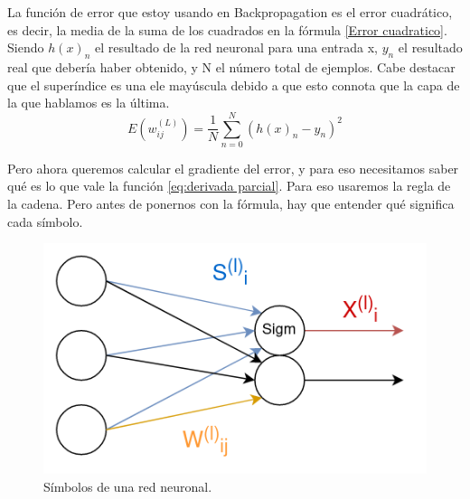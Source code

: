 La función de error que estoy usando en Backpropagation es el error cuadrático, es decir, la media de la suma de los cuadrados en la fórmula \ref{Error cuadratico}. Siendo $h(x)_n$ el resultado de la red neuronal para una entrada x, $y_n$ el resultado real que debería haber obtenido, y N el número total de ejemplos. Cabe destacar que el superíndice es una ele mayúscula debido a que esto connota que la capa de la que hablamos es la última.
\begin{equation}
	\label{Error cuadratico}
	E(w_{ij}^{(L)}) = \frac{1}{N}\sum_{n=0}^N(h(x)_n - y_n)^2
\end{equation}

Pero ahora queremos calcular el gradiente del error, y para eso necesitamos saber qué es lo que vale la función \ref{eq:derivada parcial}. Para eso usaremos la regla de la cadena. Pero antes de ponernos con la fórmula, hay que entender qué significa cada símbolo. 

\begin{figure}[H]
	\centering
	\includegraphics[width=15cm]{archivos/imagenes/Red-neuronal-simbolos.png}
	\caption{Símbolos de una red neuronal.}
	\label{fig:symb neural net}
\end{figure}

